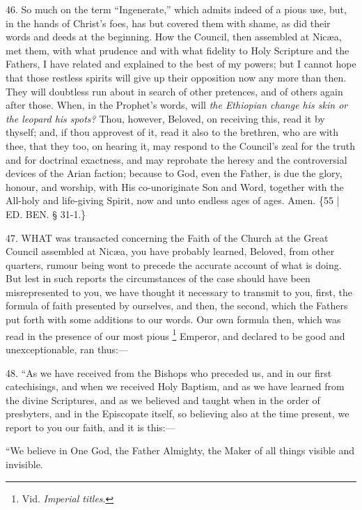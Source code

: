 46. So much on the term ``Ingenerate,''
which admits indeed of a pious use, but, in the hands of Christ's
foes, has but covered them with shame, as did their words and deeds at
the beginning. How the Council, then assembled at Nicæa, met them,
with what prudence and with what fidelity to Holy Scripture and the
Fathers, I have related and explained to the best of my powers; but I
cannot hope that those restless spirits will give up their opposition
now any more than then. They will doubtless run about in search of
other pretences, and of others again after those. When, in the Prophet's
words, will \emph{the Ethiopian change his skin or the leopard his spots?}
Thou, however, Beloved, on receiving this, read it by thyself; and, if
thou approvest of it, read it also to the brethren, who are with thee,
that they too, on hearing it, may respond to the Council's zeal for
the truth and for doctrinal exactness, and may reprobate the heresy
and the controversial devices of the Arian faction; because to God,
even the Father, is due the glory, honour, and worship, with His co-unoriginate
Son and Word, together with the All-holy and life-giving Spirit, now
and unto endless ages of ages. Amen. \{55 | ED.
BEN. § 31-1.\}


47. WHAT
was transacted concerning the Faith of the Church at the Great Council
assembled at Nicæa, you have probably learned, Beloved, from other
quarters, rumour being wont to precede the accurate account of what is
doing. But lest in such reports the circumstances of the case should
have been misrepresented to you, we have thought it necessary to
transmit to you, first, the formula of faith presented by ourselves,
and then, the second, which the Fathers put forth with some additions
to our words. Our own formula then, which was read in the presence of
our most pious \footnote{Vid. \emph{Imperial titles}.}
Emperor, and declared to be good and unexceptionable, ran thus:—

48. ``As we have received from
the Bishops who preceded us, and in our first catechisings, and when
we received Holy Baptism, and as we have learned from the divine
Scriptures, and as we believed and taught when in the order of
presbyters, and in the Episcopate itself, so believing also at the
time present, we report to you our faith, and it is this:—


``We believe in One God, the
Father Almighty, the Maker of all things visible and invisible.

